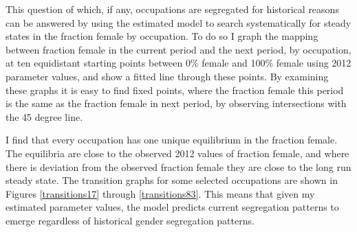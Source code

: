 \documentclass[12pt]{article}
\begin{document}

This question of which, if any, occupations are segregated for historical reasons can be answered by using the estimated model to search systematically for steady states in the fraction female by occupation. To do so I graph the mapping between fraction female in the current period and the next period, by occupation, at ten equidistant starting points between 0\% female and 100\% female using 2012 parameter values, and show a fitted line through these points. By examining these graphs it is easy to find fixed points, where the fraction female this period is the same as the fraction female in next period, by observing intersections with the 45 degree line. 




I find that every occupation has one unique equilibrium in the fraction female. The equilibria are close to the observed 2012 values of fraction female, and where there is deviation from the observed fraction female they are close to the long run steady state. The transition graphs for some selected occupations are shown in Figures \ref{transitions17} through \ref{transitions83}. This means that given my estimated parameter values, the model predicts current segregation patterns to emerge regardless of historical gender segregation patterns.




\end{document}
